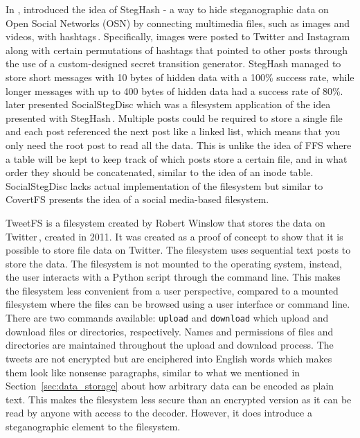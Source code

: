 In \citeyear{szczypiorskiStegHashNewMethod2016}, \citeauthor{szczypiorskiStegHashNewMethod2016} introduced the idea of StegHash - a way to hide steganographic data on Open Social Networks (OSN) by connecting multimedia files, such as images and videos, with hashtags\,\cite{szczypiorskiStegHashNewMethod2016}. Specifically, images were posted to Twitter and Instagram along with certain permutations of hashtags that pointed to other posts through the use of a custom-designed secret transition generator. StegHash managed to store short messages with 10 bytes of hidden data with a 100\% success rate, while longer messages with up to 400 bytes of hidden data had a success rate of 80\%. \citeauthor{bieniaszSocialStegDiscApplicationSteganography2017} later presented SocialStegDisc which was a filesystem application of the idea presented with StegHash\,\cite{bieniaszSocialStegDiscApplicationSteganography2017}. Multiple posts could be required to store a single file and each post referenced the next post like a linked list, which means that you only need the root post to read all the data. This is unlike the idea of FFS where a table will be kept to keep track of which posts store a certain file, and in what order they should be concatenated, similar to the idea of an inode table. SocialStegDisc lacks actual implementation of the filesystem but similar to CovertFS presents the idea of a social media-based filesystem.

TweetFS is a filesystem created by Robert Winslow that stores the data on Twitter\,\cite{winslowTweetfsTweetfsMaster}, created in 2011. It was created as a proof of concept to show that it is possible to store file data on Twitter. The filesystem uses sequential text posts to store the data. The filesystem is not mounted to the operating system, instead, the user interacts with a Python script  through the command line. This makes the filesystem less convenient from a user perspective, compared to a mounted filesystem where the files can be browsed using a user interface or command line. There are two commands available: \texttt{upload} and \texttt{download} which upload and download files or directories, respectively. Names and permissions of files and directories are maintained throughout the upload and download process. The tweets are not encrypted but are enciphered into English words which makes them look like nonsense paragraphs, similar to what we mentioned in Section~\ref{sec:data_storage} about how arbitrary data can be encoded as plain text. This makes the filesystem less secure than an encrypted version as it can be read by anyone with access to the decoder. However, it does introduce a steganographic element to the filesystem.

